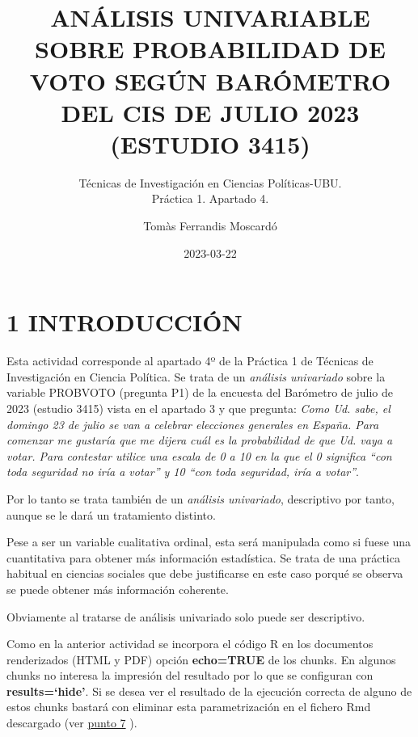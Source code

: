 \documentclass[
  12 pt,
  a4paper,
]{article}
\title{ANÁLISIS UNIVARIABLE SOBRE PROBABILIDAD DE VOTO SEGÚN BARÓMETRO
DEL CIS DE JULIO 2023\\
(ESTUDIO 3415)}
\subtitle{Técnicas de Investigación en Ciencias Políticas-UBU.\\
Práctica 1. Apartado 4.}
\author{Tomàs Ferrandis Moscardó}
\date{2023-03-22}
\begin{document}
\maketitle

{
\setcounter{tocdepth}{2}
\tableofcontents
}
\newpage

\renewcommand\tablename{Tabla}

\hypertarget{introducciuxf3n}{%
\section{1 INTRODUCCIÓN}\label{introducciuxf3n}}

Esta actividad corresponde al apartado 4º de la Práctica 1 de Técnicas
de Investigación en Ciencia Política. Se trata de un \emph{análisis
univariado} sobre la variable PROBVOTO (pregunta P1) de la encuesta del
Barómetro de julio de 2023 (estudio 3415) vista en el apartado 3 y que
pregunta: \emph{Como Ud. sabe, el domingo 23 de julio se van a celebrar
elecciones generales en España. Para comenzar me gustaría que me dijera
cuál es la probabilidad de que Ud. vaya a votar. Para contestar utilice
una escala de 0 a 10 en la que el 0 significa ``con toda seguridad no
iría a votar'' y 10 ``con toda seguridad, iría a votar''}.

Por lo tanto se trata también de un \emph{análisis univariado},
descriptivo por tanto, aunque se le dará un tratamiento distinto.

Pese a ser un variable cualitativa ordinal, esta será manipulada como si
fuese una cuantitativa para obtener más información estadística. Se
trata de una práctica habitual en ciencias sociales que debe
justificarse en este caso porqué se observa se puede obtener más
información coherente.

Obviamente al tratarse de análisis univariado solo puede ser
descriptivo.

Como en la anterior actividad se incorpora el código R en los documentos
renderizados (HTML y PDF) opción \textbf{echo=TRUE} de los chunks. En
algunos chunks no interesa la impresión del resultado por lo que se
configuran con \textbf{results=`hide'}. Si se desea ver el resultado de
la ejecución correcta de alguno de estos chunks bastará con eliminar
esta parametrización en el fichero Rmd descargado (ver
\protect\hyperlink{id-github}{punto 7} ).
\end{document}
